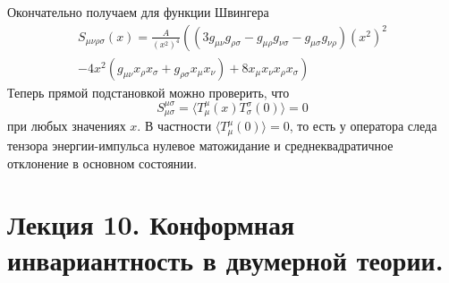 \documentclass[a4paper,12pt]{article}
\theoremstyle{definition}
\theoremstyle{definition}
\theoremstyle{definition}
\begin{document}
Окончательно получаем для функции Швингера
\begin{multline}
  \label{eq:221}
  S_{\mu\nu\rho\sigma}(x)=\frac{A}{(x^{2})^{4}} \left( (3g_{\mu\nu} g_{\rho\sigma}-g_{\mu\rho}g_{\nu\sigma}-g_{\mu\sigma}g_{\nu\rho}) (x^{2})^{2} 
  \right. \\
  \left.-4 x^{2} (g_{\mu\nu} x_{\rho}x_{\sigma} +g_{\rho\sigma}x_{\mu}x_{\nu}) +8 x_{\mu}x_{\nu}x_{\rho}x_{\sigma}\right)
\end{multline}
Теперь прямой подстановкой можно проверить, что
\begin{equation}
  \label{eq:222}
  S^{\mu\sigma}_{\mu\sigma}=\langle T^{\mu}_{\mu}(x) T^{\sigma}_{\sigma}(0)\rangle=0
\end{equation}
при любых значениях $x$. В частности $\langle T^{\mu}_{\mu}(0)\rangle=0$, то есть у оператора следа тензора энергии-импульса нулевое матожидание и среднеквадратичное отклонение в основном состоянии.

\section{Лекция 10. Конформная инвариантность в двумерной теории.}
\label{sec:lecture-10}
\end{document}
